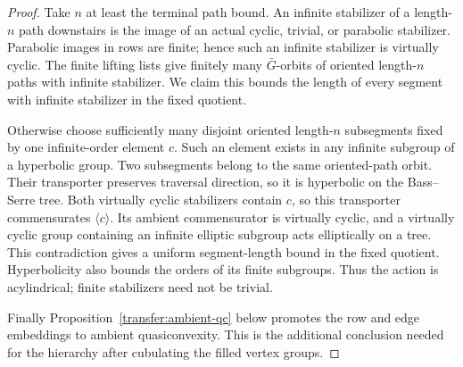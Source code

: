\begin{proof}
Take $n$ at least the terminal path bound. An infinite stabilizer of
a length-$n$ path downstairs is the image of an actual cyclic,
trivial, or parabolic stabilizer. Parabolic images in rows are finite;
hence such an infinite stabilizer is virtually cyclic. The finite
lifting lists give finitely many $\bar G$-orbits of oriented
length-$n$ paths with infinite stabilizer.
We claim this bounds the length of every segment with infinite
stabilizer in the fixed quotient.

Otherwise choose sufficiently many disjoint oriented length-$n$
subsegments fixed by one infinite-order element $c$. Such an element
exists in any infinite subgroup of a hyperbolic group. Two subsegments
belong to the same oriented-path orbit. Their transporter preserves traversal direction,
so it is hyperbolic on the Bass--Serre tree. Both virtually cyclic
stabilizers contain $c$, so this transporter commensurates
$\langle c\rangle$. Its ambient commensurator is virtually cyclic,
and a virtually cyclic group containing an infinite elliptic subgroup
acts elliptically on a tree. This contradiction gives a uniform
segment-length bound in the fixed quotient. Hyperbolicity also bounds
the orders of its finite subgroups. Thus the action is acylindrical;
finite stabilizers need not be trivial.

Finally Proposition~\ref{transfer:ambient-qc} below promotes the
row and edge embeddings to ambient quasiconvexity. This is the
additional conclusion needed for the hierarchy after cubulating the
filled vertex groups.
\end{proof}

